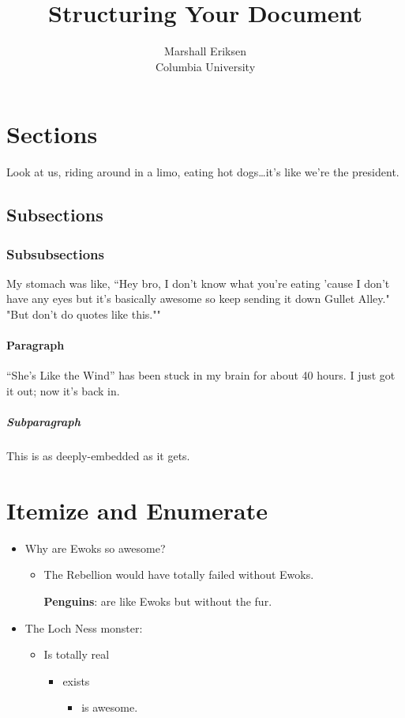 \documentclass[12pt, letterpaper]{article}
\title{Structuring Your Document}
\author{Marshall Eriksen\\Columbia University}
\date{}
\begin{document}
	
	\maketitle
	
	\section{Sections}
	\label{sec}
	
	Look at us, riding around in a limo, eating hot dogs\ldots it's like we're the president.
	
	\subsection{Subsections}
	\label{subsec}

	\subsubsection{Subsubsections}
	\label{subsubsec}
	
	My stomach was like, ``Hey bro, I don't know what you're eating 'cause I don't have any eyes but it's basically awesome so keep sending it down Gullet Alley." "But don't do quotes like this.""
	
	\paragraph{Paragraph} ``She's Like the Wind'' has been stuck in my brain for about 40 hours. I just got it out; now it's back in.
	
	\subparagraph{Subparagraph} This is as deeply-embedded as it gets.
	
	\clearpage
	
	\section{Itemize and Enumerate}
	
	\begin{itemize}
		\item Why are Ewoks so awesome?
		\begin{itemize}
			\item The Rebellion would have totally failed without Ewoks.
			\item[\textbf{Penguins}:] are like Ewoks but without the fur.
		\end{itemize}
		\item The Loch Ness monster:
		\begin{itemize}
			\item Is totally real
			\begin{itemize}
				\item exists
				\begin{itemize}
					\item is awesome.
				\end{itemize}
			\end{itemize}
		\end{itemize}
	\end{itemize}
	
\end{document}
